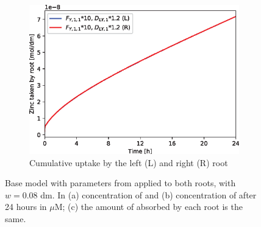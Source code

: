 \documentclass[11pt]{article}
\numberwithin{equation}{section}
\begin{document}
\begin{figure}[h]
\begin{subfigure}[t]{0.31\textwidth}
     \caption{}
     \label{fig:baseorig_Zn}
     \end{subfigure}
    \begin{subfigure}[t]{0.37\textwidth}\centering
    \includegraphics[width=\textwidth]{Figures/testpics/ZnCumulative/BasicModelCumuZn.eps}
    \caption{Cumulative  uptake by the left (L) and right (R) root}
    \label{fig:OneCn}
    \end{subfigure}
     \caption{Base model with parameters from \cite{Ptashnyk-2011} applied to both roots, with $w=0.08$ dm. In (a) concentration of  and (b) concentration of  after 24 hours in $\mu$M; (c) the amount of  absorbed by each root is the same.}
\end{figure}

\end{document}
